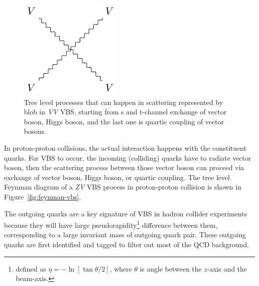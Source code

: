 \begin{figure}[!ht]
\begin{minipage}{0.18\textwidth}
  \end{minipage}%
  \begin{minipage}{0.16\textwidth}
    \includegraphics[width=\textwidth]{figures/feyn_vbs_1.pdf}
  \end{minipage}
  \caption[Tree level processes that can happen in scattering represented by blob
    in \textit{VV} VBS]%
  {Tree level processes that can happen in scattering represented by blob
    in \textit{VV} VBS, starting from s and t-channel exchange of
    vector boson, Higgs boson, and the last one is quartic
    coupling of vector bosons.
  }%
  \label{fig:feynman-vbs-blob}
\end{figure}

In proton-proton collisions, the actual interaction happens
with the constituent quarks. For \gls{VBS} to occur, the incoming
(colliding) quarks have to radiate vector boson, then the scattering
process between those vector boson can proceed via exchange of vector
boson, Higgs boson, or quartic coupling. The tree level Feynman
diagram of a \textit{ZV} VBS process in proton-proton
collision is shown in Figure~\ref{fig:feynman-vbs}.

The outgoing quarks are a key signature of \gls{VBS} in hadron collider
experiments because they will have large pseudorapidity\footnote{
  defined as \(\eta = - \ln[\tan \theta/2]\), where \(\theta \) is angle
  between the \(z\)-axis and the beam-axis. }
difference between
them, corresponding to a large invariant mass of outgoing quark pair.
These outgoing quarks are first identified
and tagged to filter out most of the \gls{QCD} background.

